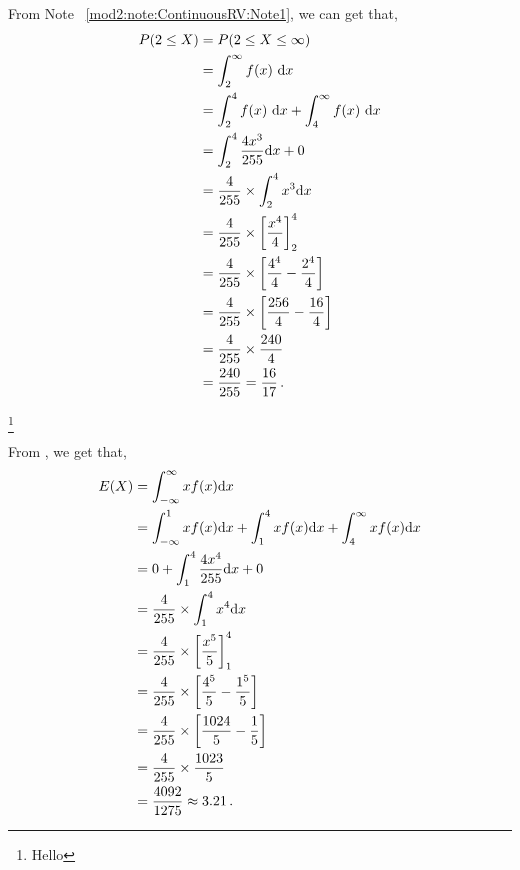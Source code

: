 \begin{subquestions}
\begin{subsubquestions}
From Note ~\ref{mod2:note:ContinuousRV:Note1}, we can get that,
\begin{align}
	P(2 \leq X) &= P(2\leq X \leq \infty) \nonumber \\
	                                 & = \int_2^{\infty} f(x)~\mathrm{d}x \nonumber \\
	                                 & = \int_2^{4} f(x)~\mathrm{d}x+\int_4^{\infty} f(x)~\mathrm{d}x \nonumber \\
	                                 & = \int_{2}^{4} \frac{4x^3}{255} \mathrm{d}x + 0 \nonumber \\
	                                 & = \frac{4}{255} \times \int_2^4 x^3\mathrm{d}x \nonumber \\
	                                 & = \frac{4}{255} \times \left[\frac{x^4}{4}\right]^4_2 \nonumber \\
	                                 & = \frac{4}{255} \times \left[\frac{4^4}{4}-\frac{2^4}{4}\right] \nonumber \\
	                                 & = \frac{4}{255} \times \left[\frac{256}{4}-\frac{16}{4}\right] \nonumber \\
	                                 & = \frac{4}{255} \times \frac{240}{4} \nonumber \\
	                                 & = \frac{240}{255} = \frac{16}{17} \,.
\end{align}
	
\footnote{Hello}

\subsubquestion

From , we get that,
\begin{align}
	E(X) & = \int_{-\infty}^{\infty} x f(x)\mathrm{d}x \nonumber \\
		 & = \int_{-\infty}^{1}xf(x)\mathrm{d}x + \int_{1}^{4} xf(x)\mathrm{d}x + \int_{4}^{\infty} xf(x)\mathrm{d}x \nonumber \\
		 & = 0 + \int_{1}^{4} \frac{4x^4}{255} \mathrm{d}x + 0 \nonumber \\
	     & = \frac{4}{255} \times \int_{1}^{4} x^4 \mathrm{d}x \nonumber \\
	     & = \frac{4}{255} \times \left[\frac{x^5}{5}\right]^4_1 \nonumber \\
	     & = \frac{4}{255} \times \left[\frac{4^5}{5} - \frac{1^5}{5}\right] \nonumber \\
	     & = \frac{4}{255} \times \left[\frac{1024}{5} - \frac{1}{5}\right] \nonumber \\
	     & = \frac{4}{255} \times \frac{1023}{5} \nonumber \\
	     & = \frac{4092}{1275} \approx 3.21 \,. 
\end{align}


\end{subsubquestions}
\end{subquestions}
